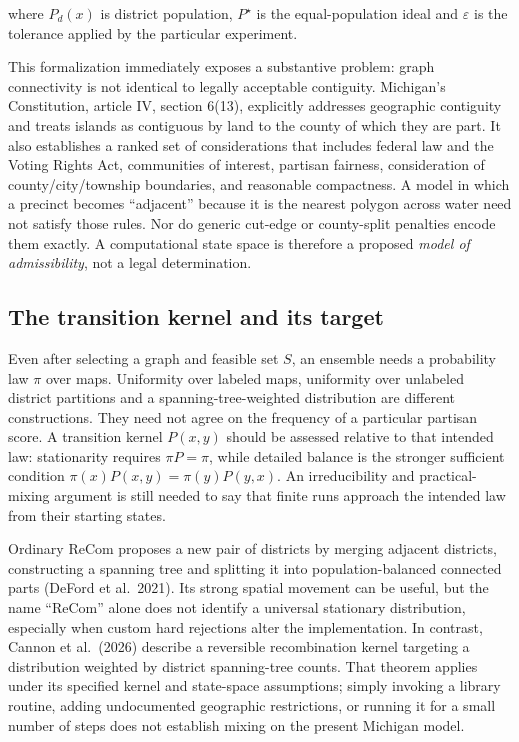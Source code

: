 \documentclass[
  10pt,
]{article}
\begin{document}
where \(P_d(x)\) is district population, \(P^{\star}\) is the
equal-population ideal and \(\varepsilon\) is the tolerance applied by
the particular experiment.

This formalization immediately exposes a substantive problem: graph
connectivity is not identical to legally acceptable contiguity.
Michigan's Constitution, article IV, section 6(13), explicitly addresses
geographic contiguity and treats islands as contiguous by land to the
county of which they are part. It also establishes a ranked set of
considerations that includes federal law and the Voting Rights Act,
communities of interest, partisan fairness, consideration of
county/city/township boundaries, and reasonable compactness. A model in
which a precinct becomes ``adjacent'' because it is the nearest polygon
across water need not satisfy those rules. Nor do generic cut-edge or
county-split penalties encode them exactly. A computational state space
is therefore a proposed \emph{model of admissibility}, not a legal
determination.

\hypertarget{the-transition-kernel-and-its-target}{%
\subsection{The transition kernel and its
target}\label{the-transition-kernel-and-its-target}}

Even after selecting a graph and feasible set \(S\), an ensemble needs a
probability law \(\pi\) over maps. Uniformity over labeled maps,
uniformity over unlabeled district partitions and a
spanning-tree-weighted distribution are different constructions. They
need not agree on the frequency of a particular partisan score. A
transition kernel \(P(x,y)\) should be assessed relative to that
intended law: stationarity requires \(\pi P=\pi\), while detailed
balance is the stronger sufficient condition
\(\pi(x)P(x,y)=\pi(y)P(y,x)\). An irreducibility and practical-mixing
argument is still needed to say that finite runs approach the intended
law from their starting states.

Ordinary ReCom proposes a new pair of districts by merging adjacent
districts, constructing a spanning tree and splitting it into
population-balanced connected parts (DeFord et al.~2021). Its strong
spatial movement can be useful, but the name ``ReCom'' alone does not
identify a universal stationary distribution, especially when custom
hard rejections alter the implementation. In contrast, Cannon et
al.~(2026) describe a reversible recombination kernel targeting a
distribution weighted by district spanning-tree counts. That theorem
applies under its specified kernel and state-space assumptions; simply
invoking a library routine, adding undocumented geographic restrictions,
or running it for a small number of steps does not establish mixing on
the present Michigan model.
\end{document}
